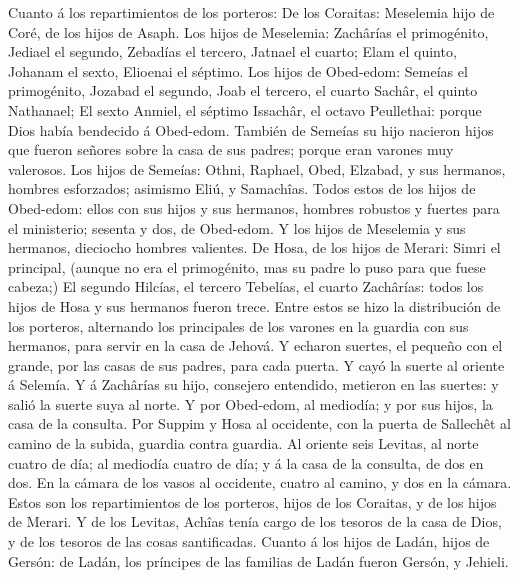  Cuanto á los repartimientos de los porteros: De los
Coraitas: Meselemia hijo de Coré, de los hijos de Asaph. 
Los hijos de Meselemia: Zachârías el primogénito, Jediael el segundo,
Zebadías el tercero, Jatnael el cuarto;  Elam el quinto,
Johanam el sexto, Elioenai el séptimo.  Los hijos de
Obed-edom: Semeías el primogénito, Jozabad el segundo, Joab el tercero,
el cuarto Sachâr, el quinto Nathanael;  El sexto Anmiel,
el séptimo Issachâr, el octavo Peullethai: porque Dios había bendecido á
Obed-edom.  También de Semeías su hijo nacieron hijos que
fueron señores sobre la casa de sus padres; porque eran varones muy
valerosos.  Los hijos de Semeías: Othni, Raphael, Obed,
Elzabad, y sus hermanos, hombres esforzados; asimismo Eliú, y Samachîas.
 Todos estos de los hijos de Obed-edom: ellos con sus
hijos y sus hermanos, hombres robustos y fuertes para el ministerio;
sesenta y dos, de Obed-edom.  Y los hijos de Meselemia y
sus hermanos, dieciocho hombres valientes.  De Hosa, de
los hijos de Merari: Simri el principal, (aunque no era el primogénito,
mas su padre lo puso para que fuese cabeza;)  El segundo
Hilcías, el tercero Tebelías, el cuarto Zachârías: todos los hijos de
Hosa y sus hermanos fueron trece.  Entre estos se hizo la
distribución de los porteros, alternando los principales de los varones
en la guardia con sus hermanos, para servir en la casa de Jehová.
 Y echaron suertes, el pequeño con el grande, por las
casas de sus padres, para cada puerta.  Y cayó la suerte
al oriente á Selemía. Y á Zachârías su hijo, consejero entendido,
metieron en las suertes: y salió la suerte suya al norte.
 Y por Obed-edom, al mediodía; y por sus hijos, la casa
de la consulta.  Por Suppim y Hosa al occidente, con la
puerta de Sallechêt al camino de la subida, guardia contra guardia.
 Al oriente seis Levitas, al norte cuatro de día; al
mediodía cuatro de día; y á la casa de la consulta, de dos en dos.
 En la cámara de los vasos al occidente, cuatro al
camino, y dos en la cámara.  Estos son los repartimientos
de los porteros, hijos de los Coraitas, y de los hijos de Merari.
 Y de los Levitas, Achîas tenía cargo de los tesoros de
la casa de Dios, y de los tesoros de las cosas santificadas.
 Cuanto á los hijos de Ladán, hijos de Gersón: de Ladán,
los príncipes de las familias de Ladán fueron Gersón, y Jehieli.
